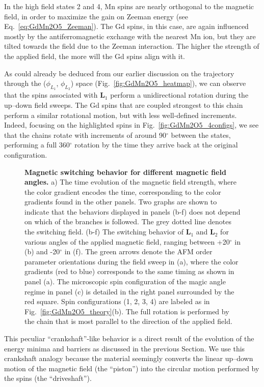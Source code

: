 In the high field states 2 and 4, Mn spins are nearly orthogonal to the magnetic field, in order to maximize the gain on Zeeman energy (see Eq.~\eqref{eq:GdMn2O5_Zeeman}).
The Gd spins, in this case, are again influenced mostly by the antiferromagnetic exchange with the nearest Mn ion, but they are tilted towards the field due to the Zeeman interaction.
The higher the strength of the applied field, the more will the Gd spins align with it.

As could already be deduced from our earlier discussion on the trajectory through the ($\phi_{L_1}$, $\phi_{L_2}$) space (Fig.~\ref{fig:GdMn2O5_heatmap}), we can observe that the spins associated with $\bm L_1$ perform a unidirectional rotation during the up--down field sweeps.
The Gd spins that are coupled strongest to this chain perform a similar rotational motion, but with less well-defined increments.
Indeed, focusing on the highlighted spins in Fig.~\ref{fig:GdMn2O5_4configs}, we see that the chains rotate with increments of around 90$^\circ$ between the states, performing a full 360$^\circ$ rotation by the time they arrive back at the original configuration.
\begin{figure}[h!]
	\caption{{\bf Magnetic switching behavior for different magnetic field angles.} a) The time evolution of the magnetic field strength, where the color gradient encodes the time, corresponding to the color gradients found in the other panels. Two graphs are shown to indicate that the behaviors displayed in panels (b-f) does not depend on which of the branches is followed. The grey dotted line denotes the switching field. (b-f) The switching behavior of $\bm L_1$ and $\bm L_2$ for various angles of the applied magnetic field, ranging between +20$^\circ$ in (b) and -20$^\circ$ in (f). The green arrows denote the AFM order parameter orientations during the field sweep in (a), where the color gradients (red to blue) corresponds to the same timing as shown in panel (a). The microscopic spin configuration of the magic angle regime in panel (c) is detailed in the right panel surrounded by the red square. Spin configurations (1, 2, 3, 4) are labeled as in Fig.~\ref{fig:GdMn2O5_theory}(b). The full rotation is performed by the chain that is most parallel to the direction of the applied field. \label{fig:GdMn2O5_regimes}}  
\end{figure}
This peculiar ``crankshaft''-like behavior is a direct result of the evolution of the energy minima and barriers as discussed in the previous Section.
We use this crankshaft analogy because the material seemingly converts the linear up--down motion of the magnetic field (the ``piston'') into the circular motion performed by the spins (the ``driveshaft'').

